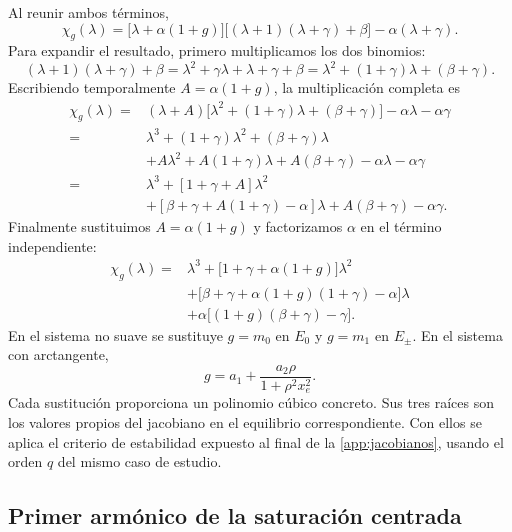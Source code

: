 Al reunir ambos términos,
\begin{equation}
\chi_g(\lambda)
=\bigl[\lambda+\alpha(1+g)\bigr]
\bigl[(\lambda+1)(\lambda+\gamma)+\beta\bigr]
-\alpha(\lambda+\gamma).
\label{eq:polinomio_caracteristico_agrupado}
\end{equation}
Para expandir el resultado, primero multiplicamos los dos binomios:
\[
(\lambda+1)(\lambda+\gamma)+\beta
=\lambda^2+\gamma\lambda+\lambda+\gamma+\beta
=\lambda^2+(1+\gamma)\lambda+(\beta+\gamma).
\]
Escribiendo temporalmente \(A=\alpha(1+g)\), la multiplicación completa es
\begin{align*}
\chi_g(\lambda)
={}&(\lambda+A)
\bigl[\lambda^2+(1+\gamma)\lambda+(\beta+\gamma)\bigr]
-\alpha\lambda-\alpha\gamma\\
={}&\lambda^3+(1+\gamma)\lambda^2+(\beta+\gamma)\lambda\\
&+A\lambda^2+A(1+\gamma)\lambda+A(\beta+\gamma)
-\alpha\lambda-\alpha\gamma\\
={}&\lambda^3+[1+\gamma+A]\lambda^2\\
&+[\beta+\gamma+A(1+\gamma)-\alpha]\lambda
+A(\beta+\gamma)-\alpha\gamma.
\end{align*}
Finalmente sustituimos \(A=\alpha(1+g)\) y factorizamos \(\alpha\) en el
término independiente:
\begin{equation}
\begin{aligned}
\chi_g(\lambda)
={}&\lambda^3+
\bigl[1+\gamma+\alpha(1+g)\bigr]\lambda^2\\
&+\bigl[
\beta+\gamma+\alpha(1+g)(1+\gamma)-\alpha
\bigr]\lambda\\
&+\alpha\bigl[(1+g)(\beta+\gamma)-\gamma\bigr].
\end{aligned}
\label{eq:polinomio_caracteristico_expandido}
\end{equation}
En el sistema no suave se sustituye \(g=m_0\) en \(E_0\) y \(g=m_1\)
en \(E_\pm\). En el sistema con arctangente,
\[
g=a_1+\frac{a_2\rho}{1+\rho^2x_e^2}.
\]
Cada sustitución proporciona un polinomio cúbico concreto. Sus tres raíces
son los valores propios del jacobiano en el equilibrio correspondiente.
Con ellos se aplica el criterio de estabilidad expuesto al final de
la \cref{app:jacobianos}, usando el orden \(q\) del mismo caso de estudio.

\fi
\ifnum{}\relax
\subsection{Primer armónico de la saturación centrada}
\label{app:df_saturacion_centrada}

